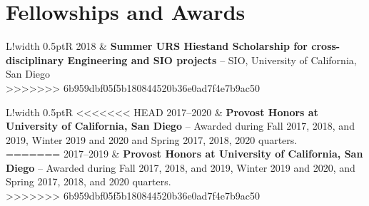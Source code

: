 \documentclass[10pt]{article}
\newcommand\VRule{\color{lightgray}\vrule width 0.5pt}
\begin{document}
\vspace{.3cm}
\section*{Fellowships and Awards}
\vspace{.3cm}
\begin{tabular}{L!{\VRule}R}
2018 & \textbf{Summer URS Hiestand Scholarship for cross-disciplinary Engineering and SIO projects} -- SIO, University of California, San Diego\\[5pt]
>>>>>>> 6b959dbf05f5b180844520b36e0ad7f4e7b9ac50
\end{tabular}
\newline \noindent
\newline \noindent 
\newline \noindent
\begin{tabular}{L!{\VRule}R}
<<<<<<< HEAD
2017--2020 & \textbf{Provost Honors at University of California, San Diego} -- Awarded during Fall 2017, 2018, and 2019, Winter 2019 and 2020 and Spring 2017, 2018, 2020 quarters.\\[5pt]
=======
2017--2019 & \textbf{Provost Honors at University of California, San Diego} -- Awarded during Fall 2017, 2018, and 2019, Winter 2019 and 2020, and Spring 2017, 2018, and 2020 quarters.\\[5pt]
>>>>>>> 6b959dbf05f5b180844520b36e0ad7f4e7b9ac50
\end{tabular}


\vspace{.3cm}
\end{document}
